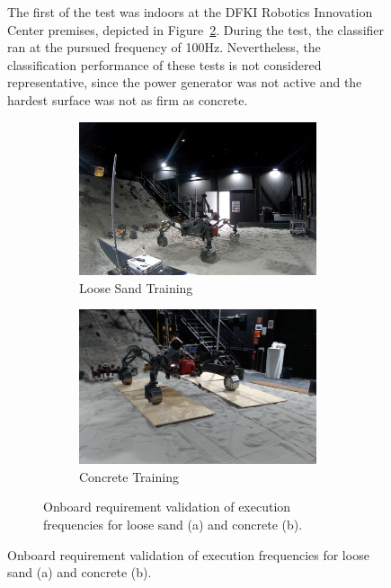 \documentclass{article}
\begin{document}
\begin{figure}[!htb]
The first of the test was indoors at the DFKI Robotics Innovation Center premises, depicted in Figure~\ref{fig:sh-tests}.
During the test, the classifier ran at the pursued frequency of 100Hz.
Nevertheless, the classification performance of these tests is not considered representative, since the power generator was not active and the hardest surface was not as firm as concrete. 

\begin{figure}[!htb]
    \centering
    \begin{subfigure}[t]{0.4\textwidth}
        \includegraphics[width=\textwidth]{../figures/spacehall.png}
        \caption{Loose Sand Training}
    \end{subfigure}
    \begin{subfigure}[t]{0.4\textwidth}
        \includegraphics[width=\textwidth]{../figures/spacehallconcrete.png}
        \caption{Concrete Training}
    \end{subfigure}
    \caption{Onboard requirement validation of execution frequencies for loose sand (a) and concrete (b).}
    \label{fig:sh-tests}
\end{figure}


\end{figure}
\end{document}
